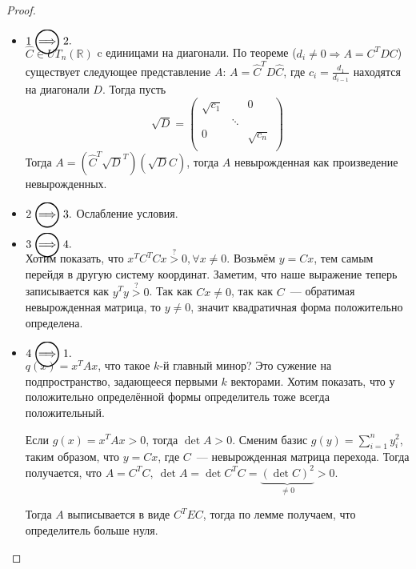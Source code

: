 \begin{proof}\leavevmode
    \begin{itemize}
        \item $1 \ora 2.$\\
            $\hat{C}\in UT_n(\mathbb{R})$ c единицами на диагонали.
            По теореме ($d_i \ne 0 \Rightarrow A = C^TDC$) %
            существует следующее представление $A$:
            $A = \hat{C}^T D \hat{C}$, где $c_i = \frac{d_1}{d_{i - 1}}$ находятся на диагонали $D$.
            Тогда пусть
            \[
                \sqrt{D} = 
                \begin{pmatrix}
                    \sqrt{c_1} & & 0 \\
                    & \ddots &\\
                    0 & & \sqrt{c_n}\\
                \end{pmatrix}
            \]
            Тогда $A = \left(\hat{C}^T\sqrt{D}^T\right)\left(\sqrt{D}\hat{C}\right)$, тогда $A$ невырожденная как произведение 
            невырожденных.
        \item
            $2 \ora 3.$ Ослабление условия.
        \item
            $3 \ora 4.$\\
            Хотим показать, что $x^TC^T Cx \stackrel{?}{>} 0, \forall x\not=0$. Возьмём  $y  = Cx$, тем самым перейдя в другую систему 
            координат. Заметим, что наше выражение теперь записывается как  $y^Ty \stackrel{?}{>} 0$. Так как $Cx \not =0$, так как
            $C$~--- обратимая невырожденная матрица, то $y \not= 0$, значит квадратичная форма положительно определена.
        \item
            $4 \ora 1.$\\
            $q(x) = x^T A x$, что такое $k$-й главный минор? Это сужение на подпространство, задающееся первыми 
            $k$ векторами.
            Хотим показать, что у положительно определённой формы определитель тоже всегда положительный.
            \begin{lemma}
                Если $g(x)  = x^T A x > 0$, тогда  $\det A > 0$.
                Сменим базис $g(y) = \sum\limits_{i = 1}^{n}{y_i^2}$, таким образом, что $y = Cx$, где $C$~--- невырожденная матрица
                перехода. Тогда получается, что $A = C^TC, \ \det A = \det C^T C = \underbrace{(\det C)^2}_{\not= 0} > 0$.
            \end{lemma}
            Тогда  $A$ выписывается в виде $C^TEC$, тогда по лемме получаем, что определитель больше нуля.
    \end{itemize}
\end{proof}
